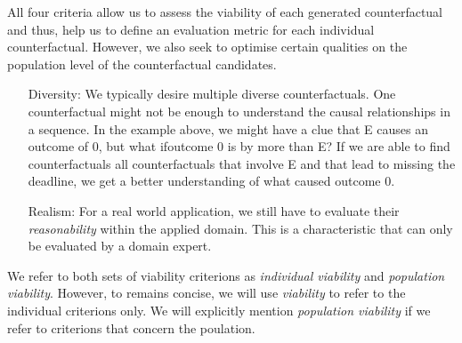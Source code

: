 \documentclass[./../../paper.tex]{subfiles}
\begin{document}
\noindent All four criteria allow us to assess the viability of each generated counterfactual and thus, help us to define an evaluation metric for each individual counterfactual. However, we also seek to optimise certain qualities on the population level of the counterfactual candidates.  

\begin{itemize}
    \item[Diversity:] We typically desire multiple diverse counterfactuals. One counterfactual might not be enough to understand the causal relationships in a sequence. In the example above, we might have a clue that E causes an outcome of 0, but what ifoutcome 0 is by more than E? If we are able to find counterfactuals all counterfactuals that involve E and that lead to missing the deadline, we get a better understanding of what caused outcome 0.
    \item[Realism:] For a real world application, we still have to evaluate their \emph{reasonability} within the applied domain. This is a characteristic that can only be evaluated by a domain expert. 
\end{itemize}

We refer to both sets of viability criterions as \emph{individual viability} and \emph{population viability}. However, to remains concise, we will use \emph{viability} to refer to the individual criterions only. We will explicitly mention \emph{population viability} if we refer to criterions that concern the poulation.
\end{document}
